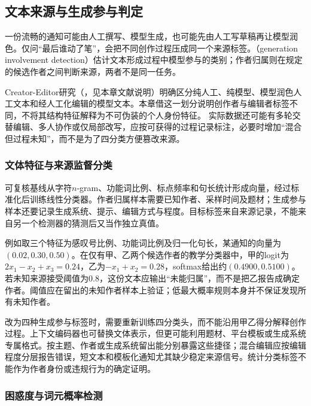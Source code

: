 \subsection{文本来源与生成参与判定}
\label{sec:nlp-classification-origin}

一份流畅的通知可能由人工撰写、模型生成，也可能先由人工写草稿再让模型润色。仅问“最后谁动了笔”，会把不同创作过程压成同一个来源标签。（generation involvement detection）估计文本形成过程中模型参与的类别；作者归属则在规定的候选作者之间判断来源，两者不是同一任务。

Creator-Editor研究（\citeyear{nlp-li2026creator}，见本章文献说明）明确区分纯人工、纯模型、模型润色人工文本和经人工化编辑的模型文本。本章借这一划分说明创作者与编辑者标签不同，不将其结构特征解释为不可伪装的个人身份特征。
实际数据还可能有多轮交替编辑、多人协作或仅局部改写，应按可获得的过程记录标注，必要时增加“混合但过程未知”，而不是为了四分类方便篡改来源。

\subsubsection{文体特征与来源监督分类}
\label{sec:nlp-classification-origin-style}

可复核基线从字符$n$-gram、功能词比例、标点频率和句长统计形成向量，经过标准化后训练线性分类器。作者归属样本需要已知作者、采样时间及题材；生成参与样本还要记录生成系统、提示、编辑方式与程度。目标标签来自来源记录，不能来自另一个检测器的猜测后又当作独立真值。

例如取三个特征为感叹号比例、功能词比例及归一化句长，某通知的向量为$(0.02,0.30,0.50)$。在仅有甲、乙两个候选作者的教学分类器中，甲的logit为$2x_1-x_2+x_3=0.24$，乙为$-x_1+x_2=0.28$，softmax给出约$(0.4900,0.5100)$。若未知来源接受阈值为0.8，这份文本应输出“未能归属”，而不是把乙报告成确定作者。阈值应在留出的未知作者样本上验证；低最大概率规则本身并不保证发现所有未知作者。

改为四种生成参与标签时，需要重新训练四分类头，而不能沿用甲乙得分解释创作过程。上下文编码器也可替换文体表示，但更可能利用题材、平台模板或生成系统专属格式。按主题、作者或生成系统留出能分别暴露这些捷径；混合编辑应按编辑程度分层报告错误，短文本和模板化通知尤其缺少稳定来源信号。统计分类标签不能作为作者身份或违规行为的确定证明。

\subsubsection{困惑度与词元概率检测}
\label{sec:nlp-classification-origin-perplexity}


